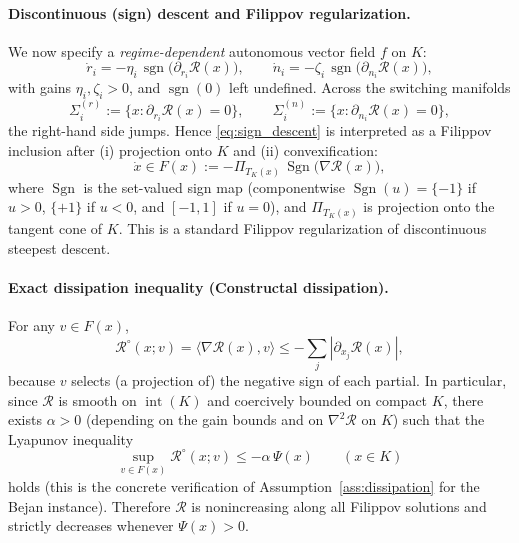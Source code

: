 \documentclass[12pt]{article}
\theoremstyle{plain}
\theoremstyle{definition}
\theoremstyle{remark}
\begin{document}
\paragraph{Discontinuous (sign) descent and Filippov regularization.}
We now specify a \emph{regime-dependent} autonomous vector field $f$ on $K$:
\begin{equation}
\dot r_i = -\eta_i\,\operatorname{sgn}\!\big(\partial_{r_i}\mathcal R(x)\big),
\qquad
\dot n_i = -\zeta_i\,\operatorname{sgn}\!\big(\partial_{n_i}\mathcal R(x)\big),
\label{eq:sign_descent}
\end{equation}
with gains $\eta_i,\zeta_i>0$, and $\operatorname{sgn}(0)$ left undefined.
Across the switching manifolds
\[
\Sigma^{(r)}_i:=\{x:\partial_{r_i}\mathcal R(x)=0\},\qquad
\Sigma^{(n)}_i:=\{x:\partial_{n_i}\mathcal R(x)=0\},
\]
the right-hand side jumps. Hence \eqref{eq:sign_descent} is interpreted as a
Filippov inclusion after (i) projection onto $K$ and (ii) convexification:
\begin{equation}
\dot x \in F(x)
:=
-\Pi_{T_K(x)}\,\operatorname{Sgn}\big(\nabla \mathcal R(x)\big),
\label{eq:filippov_bejan_inclusion}
\end{equation}
where $\operatorname{Sgn}$ is the set-valued sign map (componentwise
$\operatorname{Sgn}(u)=\{-1\}$ if $u>0$, $\{+1\}$ if $u<0$, and $[-1,1]$ if $u=0$),
and $\Pi_{T_K(x)}$ is projection onto the tangent cone of $K$.
This is a standard Filippov regularization of discontinuous steepest descent.

\paragraph{Exact dissipation inequality (Constructal dissipation).}
For any $v\in F(x)$,
\[
\mathcal R^\circ(x;v)
=
\langle \nabla \mathcal R(x),v\rangle
\le
-\sum_{j} |\partial_{x_j}\mathcal R(x)|,
\]
because $v$ selects (a projection of) the negative sign of each partial.
In particular, since $\mathcal R$ is smooth on $\operatorname{int}(K)$ and
coercively bounded on compact $K$, there exists $\alpha>0$ (depending on the
gain bounds and on $\nabla^2\mathcal R$ on $K$) such that the Lyapunov inequality
\begin{equation}
\sup_{v\in F(x)} \mathcal R^\circ(x;v)
\le -\alpha\,\Psi(x)
\qquad (x\in K)
\label{eq:dissipation_bejan_application}
\end{equation}
holds (this is the concrete verification of Assumption~\ref{ass:dissipation}
for the Bejan instance). Therefore $\mathcal R$ is nonincreasing along all
Filippov solutions and strictly decreases whenever $\Psi(x)>0$.
\end{document}
